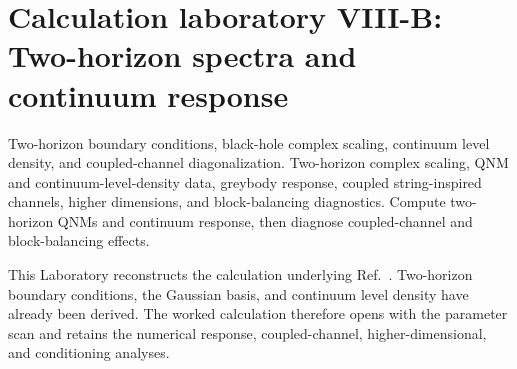 \section{Calculation laboratory VIII-B: Two-horizon spectra and continuum response}
\label{lab:2605_03277}

\calculationroute
  {Two-horizon boundary conditions, black-hole complex scaling, continuum level density, and coupled-channel diagonalization.}
  {Two-horizon complex scaling, QNM and continuum-level-density data, greybody response, coupled string-inspired channels, higher dimensions, and block-balancing diagnostics.}
  {Compute two-horizon QNMs and continuum response, then diagnose coupled-channel and block-balancing effects.}

This Laboratory reconstructs the calculation underlying
Ref.~\cite{Ogawa:2026dSCSM}.  Two-horizon boundary conditions, the Gaussian
basis, and continuum level density have already been derived.  The worked
calculation therefore opens with the parameter scan and retains the numerical
response, coupled-channel, higher-dimensional, and conditioning analyses.

